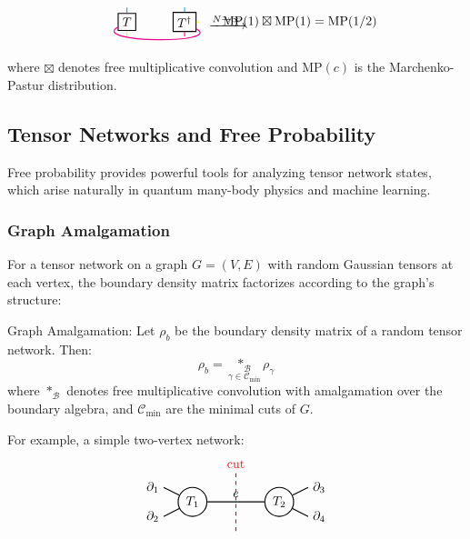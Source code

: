 \[
\begin{tikzpicture}[baseline=-.5em, scale=0.8]
   \node[draw, thick] (T1) at (0,0) {$T$};
   \node[draw, thick] (T2) at (2,0) {$T^{\dagger}$};
   \draw[cyan, thick] (T1) -- ++(0,.5);
   \draw[magenta, thick] (T1) to[out=-150,in=-30] (T2);
   \draw[yellow, thick] (T1) -- ++(0,-.5);
   \draw[cyan, thick] (T2) -- ++(0,.5);
   \draw[magenta, thick] (T2) -- ++(0,-.5);
   \draw[yellow, thick] (T2) -- ++(.5,0);
   \node at (3.5,0) {$\xrightarrow{N \to \infty}$};
   \node at (6,0) {$\mathrm{MP}(1) \boxtimes \mathrm{MP}(1) = \mathrm{MP}(1/2)$};
\end{tikzpicture}
\]

where $\boxtimes$ denotes free multiplicative convolution and $\mathrm{MP}(c)$ is the Marchenko-Pastur distribution.

\subsection{Tensor Networks and Free Probability}

Free probability provides powerful tools for analyzing tensor network states, which arise naturally in quantum many-body physics and machine learning.

\subsubsection{Graph Amalgamation}

For a tensor network on a graph $G = (V, E)$ with random Gaussian tensors at each vertex, the boundary density matrix factorizes according to the graph's structure:

Graph Amalgamation:
Let $\rho_b$ be the boundary density matrix of a random tensor network. Then:
\[
   \rho_b = \underset{\gamma \in \mathcal{C}_{\min}}{*_{\mathcal{B}}} \rho_{\gamma}
\]
where $*_{\mathcal{B}}$ denotes free multiplicative convolution with amalgamation over the boundary algebra, and $\mathcal{C}_{\min}$ are the minimal cuts of $G$.

For example, a simple two-vertex network:
\[
\begin{tikzpicture}[baseline=0, scale=0.8]
   \node[draw, thick, circle] (T1) at (0,0) {$T_1$};
   \node[draw, thick, circle] (T2) at (3,0) {$T_2$};
   \draw[thick] (T1) -- (T2) node[midway, above] {$e$};
   \draw[thick] (T1) -- ++(-1,.5) node[left] {$\partial_1$};
   \draw[thick] (T1) -- ++(-1,-.5) node[left] {$\partial_2$};
   \draw[thick] (T2) -- ++(1,.5) node[right] {$\partial_3$};
   \draw[thick] (T2) -- ++(1,-.5) node[right] {$\partial_4$};
   \draw[dashed, red, thick] (1.5,-1) -- (1.5,1) node[above] {cut};
\end{tikzpicture}
\]

